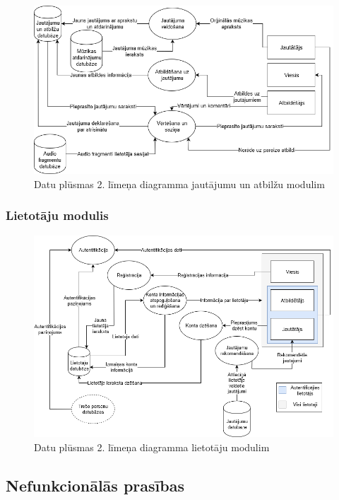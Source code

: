 \documentclass[12pt]{article}
\begin{document}
\begin{figure}[H]
\begin{center}
	\includegraphics[scale=0.5]{DPD2_2.png}
	\caption{Datu plūsmas 2. līmeņa diagramma jautājumu un atbilžu modulim}
	\label{fig:dpd_2_2}
\end{center}
\end{figure}

\subsubsection{Lietotāju modulis}

\begin{figure}[H]
\begin{center}
	\includegraphics[scale=0.5]{DPD2_3.png}
	\caption{Datu plūsmas 2. līmeņa diagramma lietotāju modulim}
	\label{fig:dpd_2_3}
\end{center}
\end{figure}

\subsection{Nefunkcionālās prasības}
\end{document}
